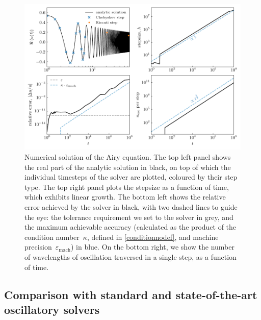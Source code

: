 \documentclass[10pt]{article}
\newcommand{\om}{\omega}
\begin{document}
\begin{figure}[tb]
    \centering
    \includegraphics{plots/airy-numsol.pdf}
    \caption{\label{airy-results} Numerical solution of the Airy equation. The
    top left panel shows the real part of the analytic solution in black, on
    top of which the individual timesteps of the solver are plotted, coloured
    by their step type. The top right panel plots the stepsize as a function of
    time, which exhibits linear growth. The bottom left shows the relative
    error achieved by the solver in black, with two dashed lines to guide the
    eye: the tolerance requirement we set to the solver in grey, and the
    maximum achievable accuracy (calculated as the product of the condition
    number~$\kappa$, defined in \cref{conditionnodef}, and machine precision~$\varepsilon_{\text{mach}}$) in blue. On the
    bottom right, we show the number of wavelengths of oscillation traversed in
    a single step, as a function of time. 
    }
\end{figure}


\subsection{Comparison with standard and state-of-the-art oscillatory solvers \label{solvercomp}}
\end{document}
